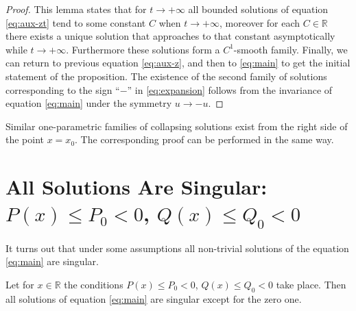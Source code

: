 \begin{proof}
	This lemma states that for $t \to +\infty$ all bounded solutions of equation \eqref{eq:aux-zt} tend to some constant $C$ when $t \to +\infty$, moreover for each $C \in \mathbb{R}$ there exists a unique solution that approaches to that constant asymptotically while $t \to +\infty$.
	Furthermore these solutions form a $C^1$-smooth family.
	Finally, we can return to previous equation \eqref{eq:aux-z}, and then to \eqref{eq:main} to get the initial statement of the proposition.
	The existence of the second family of solutions corresponding to the sign ``$-$'' in \eqref{eq:expansion} follows from the invariance of equation \eqref{eq:main} under the symmetry $u \to -u$.
\end{proof}

Similar one-parametric families of collapsing solutions exist from the right side of the point $x = x_0$.
The corresponding proof can be performed in the same way.

\section{All Solutions Are Singular: $P(x) \le P_0 < 0$, $Q(x) \le Q_0 < 0$}

It turns out that under some assumptions all non-trivial solutions of the equation \eqref{eq:main} are singular.
\begin{proposition}
\label{prop:all-solutions-are-singular}
	Let for $x \in \mathbb{R}$ the conditions $P(x) \le P_0 < 0$, $Q(x) \le Q_0 < 0$ take place.
	Then all solutions of equation \eqref{eq:main} are singular except for the zero one.
\end{proposition}

